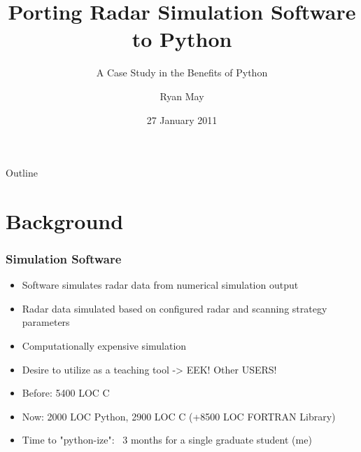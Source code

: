 \documentclass[red, hyperref={pdfpagelabels=false}]{beamer}
\title[Porting Radar Simulation Software DRAFT (\today)]
{Porting Radar Simulation Software to Python}
\subtitle{A Case Study in the Benefits of Python}
\author{Ryan May}
\institute{Enterprise Electronics Corporation}
\date{27 January 2011}
\begin{document}

\frame{\titlepage}

\section[Outline]{}
\begin{frame}{Outline}
    \tableofcontents
\end{frame}

\section{Background}
\begin{frame}
  \frametitle{Simulation Software}
  \begin{itemize}
    \item Software simulates radar data from numerical simulation output
    \item Radar data simulated based on configured radar and scanning strategy parameters
    \item Computationally expensive simulation
    \item Desire to utilize as a teaching tool -> EEK! Other USERS!
    \item Before: 5400 LOC C
    \item Now: 2000 LOC Python, 2900 LOC C (+8500 LOC FORTRAN Library)
    \item Time to "python-ize": ~3 months for a single graduate student (me)
  \end{itemize}
\end{frame}
\end{document}
